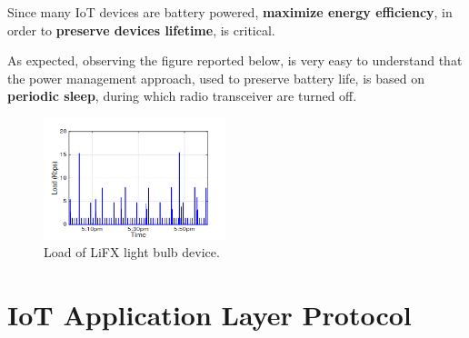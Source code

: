 \documentclass[10pt]{beamer}
\begin{document}
\begin{frame}{}

\begin{block}{}
Since many IoT devices are battery powered, \textbf{maximize energy efficiency}, in order to \textbf{preserve devices lifetime}, is critical. 
\end{block}

\begin{block}{}
As expected, observing the figure reported below, is very easy to understand that the power management approach, used to preserve battery life, is based on \textbf{periodic sleep}, during which radio transceiver are turned off.
\end{block}

\begin{figure}
  \includegraphics[width=150pt]{SleepTime.png}
  \caption{Load of LiFX light bulb device.}
  \label{fig1}
\end{figure}

\end{frame} 



\section{IoT Application Layer Protocol}
\end{document}
